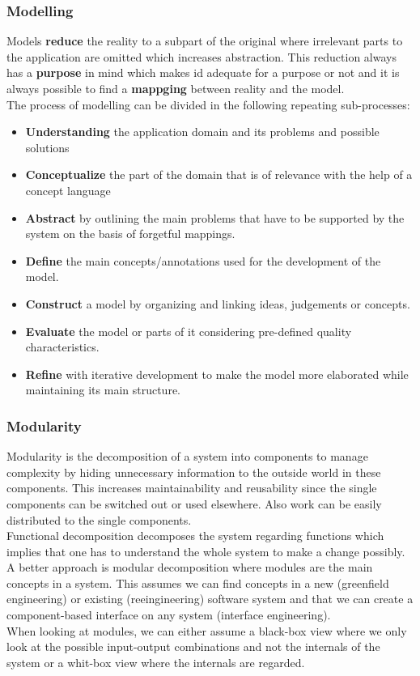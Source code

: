 \subsubsection{Modelling}
Models \textbf{reduce} the reality to a subpart of the original where irrelevant parts to the application are omitted which increases abstraction.
This reduction always has a \textbf{purpose} in mind which makes id adequate for a purpose or not and it is always possible to find a \textbf{mappging} between reality and the model.\\
The process of modelling can be divided in the following repeating sub-processes:
\begin{itemize}
  \item \textbf{Understanding} the application domain and its problems and possible solutions
  \item \textbf{Conceptualize} the part of the domain that is of relevance with the help of a concept language
  \item \textbf{Abstract} by outlining the main problems that have to be supported by the system on the basis of forgetful mappings.
  \item \textbf{Define} the main concepts/annotations used for the development of the model.
  \item \textbf{Construct} a model by organizing and linking ideas, judgements or concepts.
  \item \textbf{Evaluate} the model or parts of it considering pre-defined quality characteristics.
  \item \textbf{Refine} with iterative development to make the model more elaborated while maintaining its main structure.
\end{itemize}

\subsubsection{Modularity}
Modularity is the decomposition of a system into components to manage complexity by hiding unnecessary information to the outside world in these components.
This increases maintainability and reusability since the single components can be switched out or used elsewhere.
Also work can be easily distributed to the single components.\\
Functional decomposition decomposes the system regarding functions which implies that one has to understand the whole system to make a change possibly.
A better approach is modular decomposition where modules are the main concepts in a system.
This assumes we can find concepts in a new (greenfield engineering) or existing (reeingineering) software system  and that we can create a component-based interface on any system (interface engineering).\\
When looking at modules, we can either assume a black-box view where we only look at the possible input-output combinations and not the internals of the system or a whit-box view where the internals are regarded.

